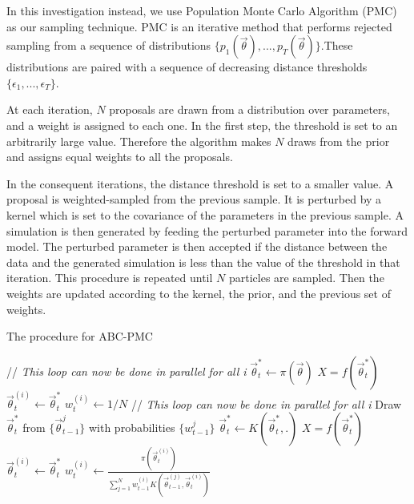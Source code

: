 \documentclass[12pt, preprint]{aastex}
\newcommand{\pars}{\vec{\theta}}
\begin{document}
In this investigation instead, we use Population Monte Carlo Algorithm (PMC) as our sampling technique. PMC is an iterative method that performs rejected sampling from a sequence of distributions $\{p_{1}(\pars),...,p_{T}(\pars)\}$.These distributions are paired with a sequence of decreasing distance thresholds $\{\epsilon_{1} , ... , \epsilon_{T}\}$.

At each iteration, $N$ proposals are drawn from a distribution over parameters, and a weight is assigned to each one. In the first step, the threshold is set to an arbitrarily large value. Therefore the algorithm makes $N$ draws from the prior and assigns equal weights to all the proposals.

In the consequent iterations, the distance threshold is set to a smaller value. A proposal is weighted-sampled from the previous sample. It is perturbed by a kernel which is set to the covariance of the parameters in the previous sample. A simulation is then generated by feeding the perturbed parameter into the forward model. The perturbed parameter is then accepted if the distance between the data and the generated simulation is less than the value of the threshold in that iteration. This procedure is repeated until $N$ particles are sampled. Then the weights are updated according to the kernel, the prior, and the previous set of weights.

\begin{algorithm}
\caption{The procedure for ABC-PMC}
\begin{algorithmic}[1]
   \STATE // \emph{This loop can now be done in parallel for all i}
   \STATE $\pars^{*}_{t} \gets \pi(\pars)$
   \STATE $X = f(\pars^{*}_{t})$
   \ENDWHILE
   \STATE $\pars^{(i)}_{t} \gets \pars^{*}_{t}$
   \STATE $w^{(i)}_{t} \gets 1/N$
\ENDFOR
\ENDIF
{}
   \STATE // \emph{This loop can now be done in parallel for all i}
   \STATE Draw $\pars^{*}_{t}$ from $\{\pars^{j}_{t-1}\}$ with probabilities $\{w^{j}_{t-1}\}$
   \STATE $\pars^{*}_{t} \gets K(\pars^{*}_{t},.)$
   \STATE $X = f(\pars^{*}_{t})$
   \ENDWHILE
   \STATE $\pars^{(i)}_{t} \gets \pars^{*}_{t}$
   \STATE $w^{(i)}_{t} \gets \frac{\pi(\pars^{(i)}_{t})}{\sum_{j=1}^{N}w_{t-1}^{(i)}K(\pars^{(j)}_{t-1},\pars^{(i)}_{t})}$
\ENDFOR
\ENDIF
\end{algorithmic}
\end{algorithm}
\end{document}
